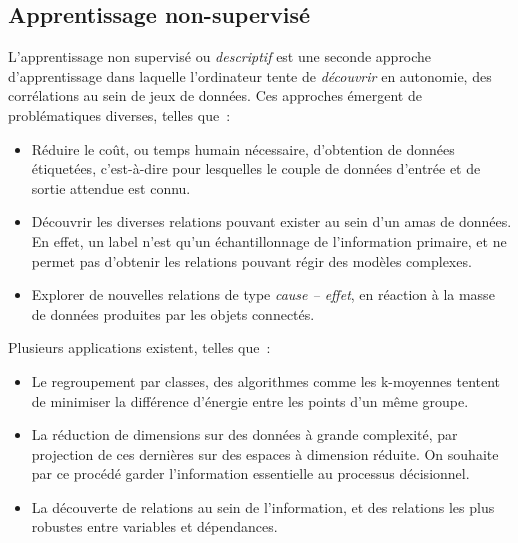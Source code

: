 \subsection{Apprentissage non-supervisé}
\label{sec:unsupervised_learning}
L’apprentissage non supervisé ou \textit{descriptif} est une seconde approche d’apprentissage dans laquelle l’ordinateur tente de \textit{découvrir} en autonomie, des corrélations au sein de jeux de données. Ces approches émergent de problématiques diverses, telles que~:
\begin{itemize}
    \item Réduire le coût, ou temps humain nécessaire, d’obtention de données étiquetées, c’est-à-dire pour lesquelles le couple de données d’entrée et de sortie attendue est connu.
    \item Découvrir les diverses relations pouvant exister au sein d’un amas de données. En effet, un label n’est qu’un échantillonnage de l’information primaire, et ne permet pas d’obtenir les relations pouvant régir des modèles complexes.
    \item Explorer de nouvelles relations de type \textit{cause – effet}, en réaction à la masse de données produites par les objets connectés. 
\end{itemize}\par

Plusieurs applications existent, telles que~:
\begin{itemize}
	\item Le regroupement par classes, des algorithmes comme les k-moyennes tentent de minimiser la différence d’énergie entre les points d’un même groupe.
	\item La réduction de dimensions sur des données à grande complexité, par projection de ces dernières sur des espaces à dimension réduite. On souhaite par ce procédé garder l’information essentielle au processus décisionnel.
	\item La découverte de relations au sein de l’information, et des relations les plus robustes entre variables et dépendances.
\end{itemize}\par
 

